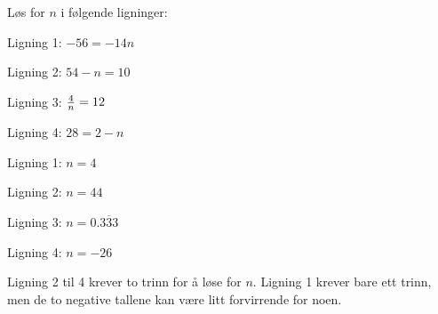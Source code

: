 

Løs for $n$ i følgende ligninger:

\vskip 20pt

Ligning 1: $-56 = -14n$

\vskip 10pt

Ligning 2: $54 - n = 10$

\vskip 10pt

Ligning 3: ${4 \over n} = 12$

\vskip 10pt

Ligning 4: $28 = 2 - n$

\vskip 20pt







Ligning 1: $n = 4$

\vskip 10pt

Ligning 2: $n = 44$

\vskip 10pt

Ligning 3: $n = 0.\overline{333}$

\vskip 10pt

Ligning 4: $n = -26$







Ligning 2 til 4 krever to trinn for å løse for $n$. Ligning 1 krever bare ett trinn, men de to negative tallene kan være litt forvirrende for noen.


